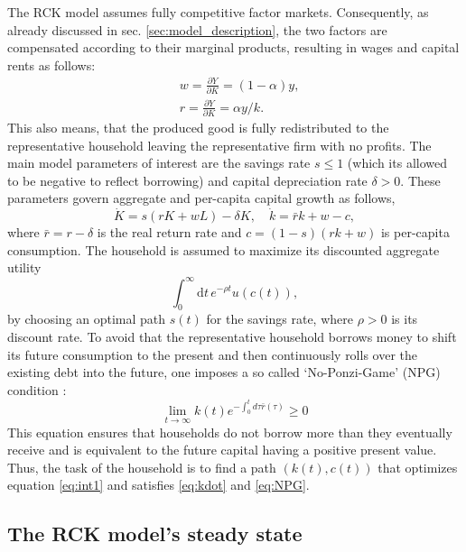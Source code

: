 The RCK model assumes fully competitive factor markets. Consequently, as already discussed in sec. \ref{sec:model_description}, the two factors are compensated according to their marginal products, resulting in wages and capital rents as follows:
\begin{align}
  &w = \frac{\partial Y}{\partial K} = (1 - \alpha) y, \label{eq:wages}\\
  &r = \frac{\partial Y}{\partial K} = \alpha y /k. \label{eq:capital_rents}
\end{align}
This also means, that the produced good is fully redistributed to the representative household leaving the representative firm with no profits.
The main model parameters of interest are the savings rate $s \le 1$ (which its allowed to be negative to reflect borrowing) 
and capital depreciation rate $\delta > 0$. These parameters govern aggregate and per-capita capital growth as follows, 
\begin{equation}
        \dot{K} = s(rK + wL) - \delta K,
        \quad \dot k = \bar{r}k + w - c,
\label{eq:kdot}
\end{equation}
where $\bar{r}=r-\delta$ is the real return rate and $c=(1-s)(rk+w)$ is per-capita consumption.
The household is assumed to maximize its discounted aggregate utility
\begin{equation}
        \int_0^{\infty} \! \mathrm{d}t \, e^{-\rho t} u(c(t)), 
        \label{eq:int1}
\end{equation}
by choosing an optimal path $s(t)$ for the savings rate, where $\rho>0$ is its discount rate.
To avoid that the representative household borrows money to shift its future consumption to the present and then continuously rolls over the existing debt into the future, one imposes a so called `No-Ponzi-Game' (NPG) condition \citep[p292]{Acemoglu2009}:
\begin{equation}
  \lim_{t \rightarrow \infty} k(t) e^{-\int_{0}^{t}d\tau \bar{r}(\tau)} \geq 0
  \label{eq:NPG}
\end{equation}
This equation ensures that households do not borrow more than they eventually receive and is equivalent to the future capital having a positive present value.
Thus, the task of the household is to find a path $(k(t),c(t))$ that optimizes equation \eqref{eq:int1} and satisfies \eqref{eq:kdot}  and \eqref{eq:NPG}.

\subsection{The RCK model's steady state}


